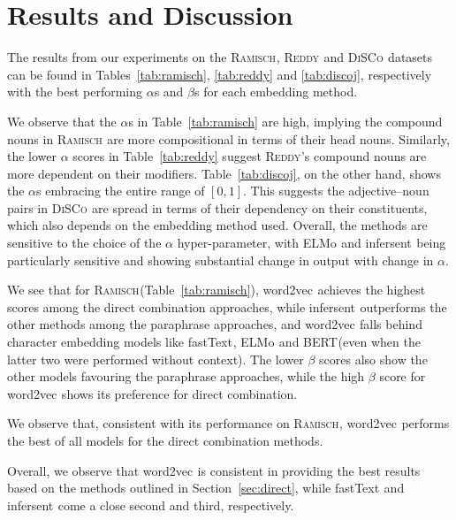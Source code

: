 \documentclass[11pt,a4paper]{article}
\newcommand{\embmethod}[2][]{\textsf{#2}$_{\text{#1}}$\xspace}
\newcommand{\wordtovec}{\embmethod{word2vec}}
\newcommand{\infersent}[1][]{\embmethod[#1]{infersent}}
\newcommand{\elmo}{\embmethod{ELMo}}
\newcommand{\fasttext}{\embmethod{fastText}}
\newcommand{\bert}{\embmethod{BERT}}
\newcommand{\dataset}[2][]{\textsc{#2}$_{\text{#1}}$\xspace}
\newcommand{\reddy}{\dataset{Reddy}}
\newcommand{\ramisch}{\dataset{Ramisch}}
\newcommand{\discoj}[1][]{\dataset[#1]{DiSCo}}
\newcommand{\tabref}[2][]{Table#1~\ref{#2}\xspace}
\newcommand{\secref}[2][]{Section#1~\ref{#2}\xspace}
\begin{document}
\section{Results and Discussion}
\label{ssec:accessibility}

The results from our experiments on the \ramisch, \reddy and \discoj datasets can be found in \tabref[s]{tab:ramisch}, \ref{tab:reddy} and \ref{tab:discoj}, respectively with the best performing $\alpha$s and $\beta$s for each embedding method.

We observe that the $\alpha$s in \tabref{tab:ramisch} are high, implying the compound nouns in \ramisch are more compositional in terms of their head nouns. Similarly, the lower $\alpha$ scores in \tabref{tab:reddy} suggest \reddy's compound nouns are more dependent on their modifiers. \tabref{tab:discoj}, on the other hand, shows the $\alpha$s embracing the entire range of $[0,1]$. This suggests the adjective--noun pairs in \discoj are spread in terms of their dependency on their constituents, which also depends on the embedding method used. Overall, the methods are sensitive to the choice of the $\alpha$ hyper-parameter, with \elmo and \infersent being particularly sensitive and showing substantial change in output with change in $\alpha$.

We see that for \ramisch (\tabref{tab:ramisch}), \wordtovec achieves the highest scores among the direct combination approaches, while \infersent outperforms the other methods among the paraphrase approaches, and \wordtovec falls behind character embedding models like \fasttext, \elmo and \bert (even when the latter two were performed without context). The lower $\beta$ scores also show the other models favouring the paraphrase approaches, while the high $\beta$ score for \wordtovec shows its preference for direct combination.

We observe that, consistent with its performance on \ramisch, \wordtovec performs the best of all models for the direct combination methods.

Overall, we observe that \wordtovec is consistent in providing the best results based on the methods outlined in \secref{sec:direct}, while \fasttext and \infersent come a close second and third, respectively.

\end{document}
